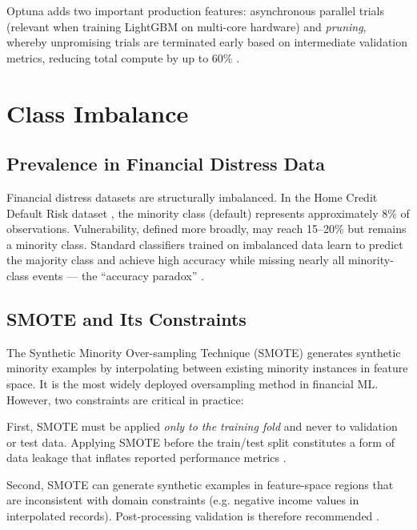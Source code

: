 \documentclass[12pt, a4paper]{article}
\begin{document}
Optuna adds two important production features: asynchronous parallel trials
(relevant when training LightGBM on multi-core hardware) and \emph{pruning},
whereby unpromising trials are terminated early based on intermediate validation
metrics, reducing total compute by up to 60\% \cite{akiba2019}.

\section{Class Imbalance}

\subsection{Prevalence in Financial Distress Data}

Financial distress datasets are structurally imbalanced.
In the Home Credit Default Risk dataset \cite{homecredit2018}, the minority class
(default) represents approximately 8\% of observations.
Vulnerability, defined more broadly, may reach 15--20\% but remains a minority
class.
Standard classifiers trained on imbalanced data learn to predict the majority class
and achieve high accuracy while missing nearly all minority-class events ---
the ``accuracy paradox'' \cite{he2009}.

\subsection{SMOTE and Its Constraints}

The Synthetic Minority Over-sampling Technique (SMOTE) \cite{chawla2002} generates
synthetic minority examples by interpolating between existing minority instances
in feature space.
It is the most widely deployed oversampling method in financial ML.
However, two constraints are critical in practice:

First, SMOTE must be applied \emph{only to the training fold} and never to validation
or test data.
Applying SMOTE before the train/test split constitutes a form of data leakage
that inflates reported performance metrics \cite{kapelner2021}.

Second, SMOTE can generate synthetic examples in feature-space regions that are
inconsistent with domain constraints (e.g. negative income values in interpolated
records).
Post-processing validation is therefore recommended \cite{he2009}.
\end{document}
